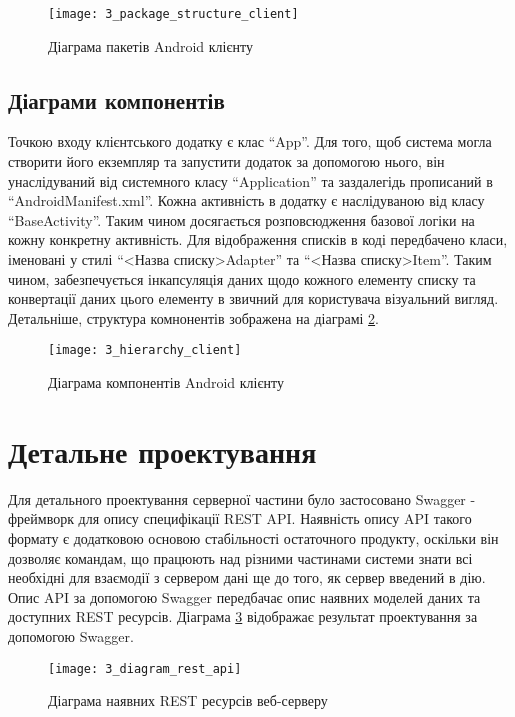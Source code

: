 \documentclass[../main.tex]{subfiles}
\begin{document}
\begin{figure}[H]
	\centering
	\texttt{[image: 3\_package\_structure\_client]}
	\caption{Діаграма пакетів Android клієнту}
	\label{client_packages}
\end{figure}

\subsection{Діаграми компонентів}

Точкою входу клієнтського додатку є клас \enquote{App}. Для того, щоб система могла створити його екземпляр та запустити додаток за допомогою нього, він унаслідуваний від системного класу \enquote{Application} та заздалегідь прописаний в \enquote{AndroidManifest.xml}. Кожна активність в додатку є наслідуваною від класу \enquote{BaseActivity}. Таким чином досягається розповсюдження базової логіки на кожну конкретну активність. Для відображення списків в коді передбачено класи, іменовані у стилі \enquote{<Назва списку>Adapter} та \enquote{<Назва списку>Item}. Таким чином, забезпечується інкапсуляція даних щодо кожного елементу списку та конвертації даних цього елементу в звичний для користувача візуальний вигляд. Детальніше, структура комнонентів зображена на діаграмі \ref{client_components}.

\begin{figure}[H]
	\centering
	\texttt{[image: 3\_hierarchy\_client]}
	\caption{Діаграма компонентів Android клієнту}
	\label{client_components}
\end{figure}

\section{Детальне проектування}

Для детального проектування серверної частини було застосовано Swagger - фреймворк для опису специфікації REST API. Наявність опису API такого формату є додатковою основою стабільності остаточного продукту, оскільки він дозволяє командам, що працюють над різними частинами системи знати всі необхідні для взаємодії з сервером дані ще до того, як сервер введений в дію. Опис API за допомогою Swagger передбачає опис наявних моделей даних та доступних REST ресурсів. Діаграма \ref{available_rest_resources} відображає результат проектування за допомогою Swagger.

\begin{figure}[H]
	\centering
	\texttt{[image: 3\_diagram\_rest\_api]}
	\caption{Діаграма наявних REST ресурсів веб-серверу}
	\label{available_rest_resources}
\end{figure}
\end{document}
